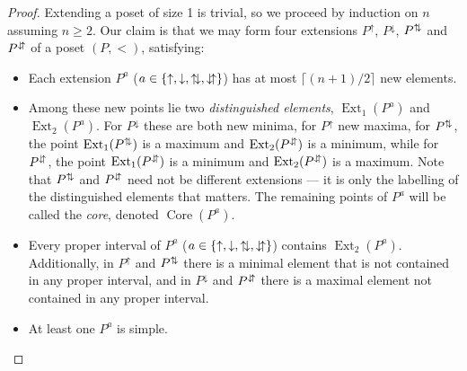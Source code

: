 \documentclass[11pt]{article}
\begin{document}
\begin{proof}
Extending a poset of size 1 is trivial, so we proceed by induction on $n$ assuming $n\geq 2$. Our claim is that we may form four extensions
$P^{\uparrow}$, $P^{\downarrow}$, $P^{{\uparrow\hspace{-2pt}\downarrow}}$ and $P^{{\downarrow\hspace{-2pt}\uparrow}}$ of a poset $(P,<)$, satisfying:

\begin{itemize}
\item
Each extension $P^{a}$ ($a\in\{ \uparrow,\downarrow,{{\uparrow\hspace{-2pt}\downarrow}},{{\downarrow\hspace{-2pt}\uparrow}}\}$) has at most $\lceil (n+1)/2\rceil$ new elements.
\item
Among these new points lie two \emph{distinguished elements}, ${\operatorname{Ext}}_1(P^a)$ and ${\operatorname{Ext}}_2(P^a)$. For $P^{\downarrow}$ these are both new minima, for $P^{\uparrow}$ new maxima, for $P^{{\uparrow\hspace{-2pt}\downarrow}}$, the point ${\operatorname{Ext}}_1(P^{{\uparrow\hspace{-2pt}\downarrow}})$ is a maximum and ${\operatorname{Ext}}_2(P^{{\downarrow\hspace{-2pt}\uparrow}})$ is a minimum, while for $P^{{\downarrow\hspace{-2pt}\uparrow}}$, the point ${\operatorname{Ext}}_1(P^{{\downarrow\hspace{-2pt}\uparrow}})$ is a minimum and ${\operatorname{Ext}}_2(P^{{\downarrow\hspace{-2pt}\uparrow}})$ is a maximum. Note that $P^{{\uparrow\hspace{-2pt}\downarrow}}$ and $P^{{\downarrow\hspace{-2pt}\uparrow}}$ need not be different extensions --- it is only the labelling of the distinguished elements that matters. The remaining points
of $P^a$ will be called the \emph{core}, denoted ${\operatorname{Core}}(P^a)$.
\item Every proper interval of $P^{a}$ ($a\in\{\uparrow,\downarrow,{{\uparrow\hspace{-2pt}\downarrow}},{{\downarrow\hspace{-2pt}\uparrow}}\}$) contains ${\operatorname{Ext}}_2(P^a)$. Additionally, in $P^\uparrow$ and $P^{{\uparrow\hspace{-2pt}\downarrow}}$ there is a minimal element that is not contained in any proper interval, and in $P^\downarrow$ and $P^{{\downarrow\hspace{-2pt}\uparrow}}$ there is a maximal element not contained in any proper interval.
\item At least one $P^{a}$ is simple.
\end{itemize}


\end{proof}
\end{document}
